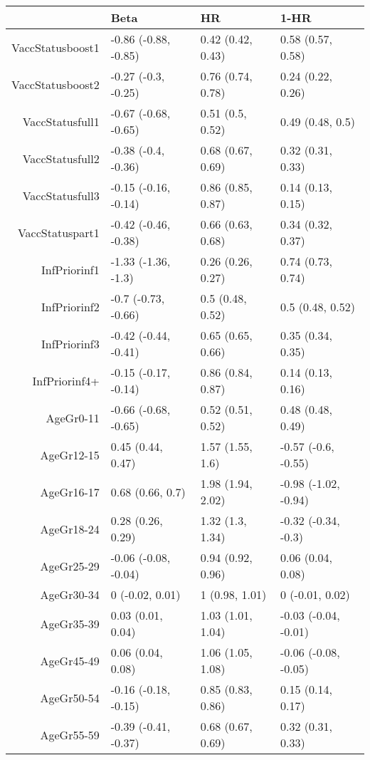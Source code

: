 \begin{table}[ht]
\centering
\begin{tabular}{rlll}
  \hline
 & Beta & HR & 1-HR \\ 
  \hline
VaccStatusboost1 & -0.86 (-0.88, -0.85) & 0.42 (0.42, 0.43) & 0.58 (0.57, 0.58) \\ 
  VaccStatusboost2 & -0.27 (-0.3, -0.25) & 0.76 (0.74, 0.78) & 0.24 (0.22, 0.26) \\ 
  VaccStatusfull1 & -0.67 (-0.68, -0.65) & 0.51 (0.5, 0.52) & 0.49 (0.48, 0.5) \\ 
  VaccStatusfull2 & -0.38 (-0.4, -0.36) & 0.68 (0.67, 0.69) & 0.32 (0.31, 0.33) \\ 
  VaccStatusfull3 & -0.15 (-0.16, -0.14) & 0.86 (0.85, 0.87) & 0.14 (0.13, 0.15) \\ 
  VaccStatuspart1 & -0.42 (-0.46, -0.38) & 0.66 (0.63, 0.68) & 0.34 (0.32, 0.37) \\ 
  InfPriorinf1 & -1.33 (-1.36, -1.3) & 0.26 (0.26, 0.27) & 0.74 (0.73, 0.74) \\ 
  InfPriorinf2 & -0.7 (-0.73, -0.66) & 0.5 (0.48, 0.52) & 0.5 (0.48, 0.52) \\ 
  InfPriorinf3 & -0.42 (-0.44, -0.41) & 0.65 (0.65, 0.66) & 0.35 (0.34, 0.35) \\ 
  InfPriorinf4+ & -0.15 (-0.17, -0.14) & 0.86 (0.84, 0.87) & 0.14 (0.13, 0.16) \\ 
  AgeGr0-11 & -0.66 (-0.68, -0.65) & 0.52 (0.51, 0.52) & 0.48 (0.48, 0.49) \\ 
  AgeGr12-15 & 0.45 (0.44, 0.47) & 1.57 (1.55, 1.6) & -0.57 (-0.6, -0.55) \\ 
  AgeGr16-17 & 0.68 (0.66, 0.7) & 1.98 (1.94, 2.02) & -0.98 (-1.02, -0.94) \\ 
  AgeGr18-24 & 0.28 (0.26, 0.29) & 1.32 (1.3, 1.34) & -0.32 (-0.34, -0.3) \\ 
  AgeGr25-29 & -0.06 (-0.08, -0.04) & 0.94 (0.92, 0.96) & 0.06 (0.04, 0.08) \\ 
  AgeGr30-34 & 0 (-0.02, 0.01) & 1 (0.98, 1.01) & 0 (-0.01, 0.02) \\ 
  AgeGr35-39 & 0.03 (0.01, 0.04) & 1.03 (1.01, 1.04) & -0.03 (-0.04, -0.01) \\ 
  AgeGr45-49 & 0.06 (0.04, 0.08) & 1.06 (1.05, 1.08) & -0.06 (-0.08, -0.05) \\ 
  AgeGr50-54 & -0.16 (-0.18, -0.15) & 0.85 (0.83, 0.86) & 0.15 (0.14, 0.17) \\ 
  AgeGr55-59 & -0.39 (-0.41, -0.37) & 0.68 (0.67, 0.69) & 0.32 (0.31, 0.33) \\ 

\end{tabular}
\end{table}
